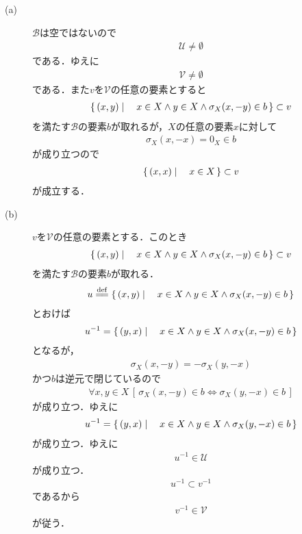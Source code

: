 	\begin{description}
		\item[(a)] $\mathscr{B}$は空ではないので
			\begin{align}
				\mathscr{U} \neq \emptyset
			\end{align}
			である．ゆえに
			\begin{align}
				\mathscr{V} \neq \emptyset
			\end{align}
			である．また$v$を$\mathscr{V}$の任意の要素とすると
			\begin{align}
				\left\{\, (x,y) \mid \quad x \in X \wedge y \in X \wedge \sigma_X(x,-y) \in b\, \right\} \subset v
			\end{align}
			を満たす$\mathscr{B}$の要素$b$が取れるが，$X$の任意の要素$x$に対して
			\begin{align}
				\sigma_X(x,-x) = 0_X \in b
			\end{align}
			が成り立つので
			\begin{align}
				\left\{\, (x,x) \mid \quad x \in X\, \right\} \subset v
			\end{align}
			が成立する．
			
		\item[(b)] $v$を$\mathscr{V}$の任意の要素とする．このとき
			\begin{align}
				\left\{\, (x,y) \mid \quad x \in X \wedge y \in X \wedge \sigma_X(x,-y) \in b\, \right\} \subset v
			\end{align}
			を満たす$\mathscr{B}$の要素$b$が取れる．
			\begin{align}
				u \defeq \Set{(x,y)}{x \in X \wedge y \in X \wedge \sigma_X(x,-y) \in b}
			\end{align}
			とおけば
			\begin{align}
				u^{-1} = \left\{\, (y,x) \mid \quad x \in X \wedge y \in X \wedge \sigma_X(x,-y) \in b\, \right\}
			\end{align}
			となるが，
			\begin{align}
				\sigma_X(x,-y) = -\sigma_X(y,-x)
			\end{align}
			かつ$b$は逆元で閉じているので
			\begin{align}
				\forall x,y \in X\, \left[\, \sigma_X(x,-y) \in b \Longleftrightarrow \sigma_X(y,-x) \in b\, \right]
			\end{align}
			が成り立つ．ゆえに
			\begin{align}
				u^{-1} = \left\{\, (y,x) \mid \quad x \in X \wedge y \in X \wedge \sigma_X(y,-x) \in b\, \right\}
			\end{align}
			が成り立つ．ゆえに
			\begin{align}
				u^{-1} \in \mathscr{U}
			\end{align}
			が成り立つ．
			\begin{align}
				u^{-1} \subset v^{-1}
			\end{align}
			であるから
			\begin{align}
				v^{-1} \in \mathscr{V}
			\end{align}
			が従う．
			

\end{description}
